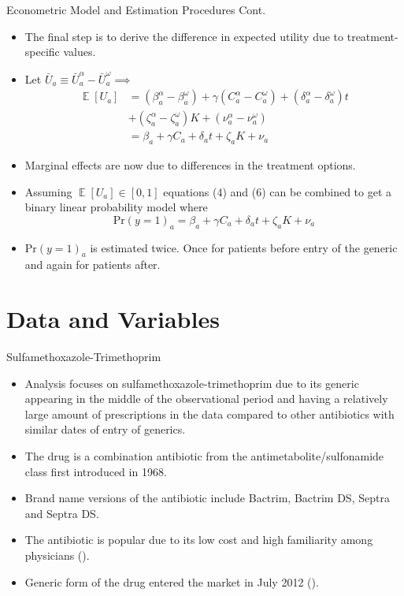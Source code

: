 \documentclass{beamer}
\DeclareMathOperator{\EX}{\mathbb{E}}
\begin{document}
\begin{frame}{Econometric Model and Estimation Procedures Cont.}
\begin{itemize}
\item The final step is to derive the difference in expected utility due to treatment-specific values.
\item Let $\bar{U}_a \equiv \bar{U}_a^\alpha - \bar{U}_a^\omega \implies$
\begin{equation}
\begin{split}
  \EX[U_a] & = (\beta_a^\alpha - \beta_a^\omega) + \gamma (C_a^\alpha - C_a^\omega) + (\delta_a^\alpha - \delta_a^\omega)t\\
  & + (\zeta^\alpha_a - \zeta^\omega_a)K + (\nu_a^\alpha - \nu_a^\omega)\\
  & = \beta_a + \gamma C_a + \delta_at + \zeta_aK + \nu_a
\end{split}
\end{equation}
\item Marginal effects are now due to differences in the treatment options.
\item Assuming $\EX[U_a] \in [0,1]$ equations (4) and (6) can be combined to get a binary linear probability model where
\begin{equation}
  \text{Pr}(y = 1)_a = \beta_a + \gamma C_a + \delta_at + \zeta_aK + \nu_a
\end{equation}
\item $\text{Pr}(y = 1)_a$ is estimated twice. Once for patients before entry of the generic and again for patients after.
\end{itemize}
\end{frame}

\section{Data and Variables}
\begin{frame}{Sulfamethoxazole-Trimethoprim}
\begin{itemize}
\item Analysis focuses on sulfamethoxazole-trimethoprim due to its generic appearing in the middle of the observational period and having a relatively large amount of prescriptions in the data compared to other antibiotics with similar dates of entry of generics.
\item The drug is a combination antibiotic from the antimetabolite/sulfonamide class first introduced in 1968.
\item Brand name versions of the antibiotic include Bactrim, Bactrim DS, Septra and Septra DS.
\item The antibiotic is popular due to its low cost and high familiarity among physicians (\cite{ho_considerations_2011}).
\item Generic form of the drug entered the market in July 2012 (\cite{noauthor_sulfamethoxazole_nodate}).
\end{itemize}

\end{frame}
\end{document}
